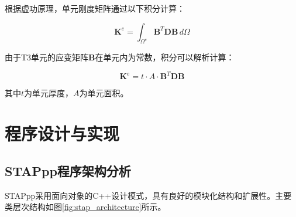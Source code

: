 \documentclass[12pt,a4paper]{article}
\begin{document}
根据虚功原理，单元刚度矩阵通过以下积分计算：

\begin{equation}
\mathbf{K}^e = \int_{\Omega^e} \mathbf{B}^T \mathbf{D} \mathbf{B} \,d\Omega
\end{equation}

由于T3单元的应变矩阵$\mathbf{B}$在单元内为常数，积分可以解析计算：

\begin{equation}
\mathbf{K}^e = t \cdot A \cdot \mathbf{B}^T \mathbf{D} \mathbf{B}
\end{equation}

其中$t$为单元厚度，$A$为单元面积。

\section{程序设计与实现}

\subsection{STAPpp程序架构分析}

STAPpp采用面向对象的C++设计模式，具有良好的模块化结构和扩展性。主要类层次结构如图\ref{fig:stap_architecture}所示。

\end{document}
